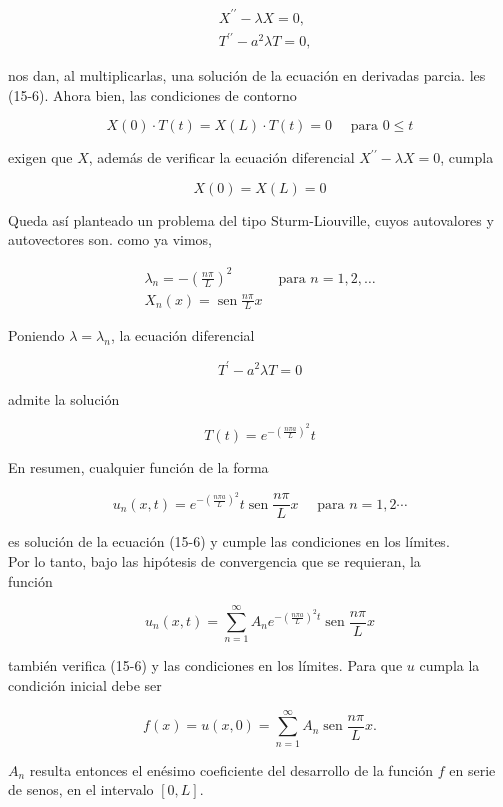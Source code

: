 \documentclass[10pt]{article}
\theoremstyle{plain}
\theoremstyle{definition}
\theoremstyle{remark}
\begin{document}
$$
\begin{aligned}
& X^{\prime \prime}-\lambda X=0, \\
& T^{\prime \prime}-a^{2} \lambda T=0,
\end{aligned}
$$

nos dan, al multiplicarlas, una solución de la ecuación en derivadas parcia. les (15-6). Ahora bien, las condiciones de contorno

$$
X(0) \cdot T(t)=X(L) \cdot T(t)=0 \quad \text { para } 0 \leqslant t
$$

exigen que $X$, además de verificar la ecuación diferencial $X^{\prime \prime}-\lambda X=0$, cumpla

$$
X(0)=X(L)=0
$$

Queda así planteado un problema del tipo Sturm-Liouville, cuyos autovalores y autovectores son. como ya vimos,

$$
\begin{array}{ll}
\lambda_{n}=-\left(\frac{n \pi}{L}\right)^{2} & \text { para } n=1,2, \ldots \\
X_{n}(x)=\operatorname{sen} \frac{n \pi}{L} x &
\end{array}
$$

Poniendo $\lambda=\lambda_{n}$, la ecuación diferencial

$$
T^{\prime}-a^{2} \lambda T=0
$$

admite la solución

$$
T(t)=e^{-\left(\frac{n \pi a}{L}\right)^{2}} t
$$

En resumen, cualquier función de la forma

$$
u_{n}(x, t)=e^{-\left(\frac{n \pi a}{L}\right)^{2}} t \operatorname{sen} \frac{n \pi}{L} x \quad \text { para } n=1,2 \cdots
$$

es solución de la ecuación (15-6) y cumple las condiciones en los límites.\\
Por lo tanto, bajo las hipótesis de convergencia que se requieran, la\\
función

$$
u_{n}(x, t)=\sum_{n=1}^{\infty} A_{n} e^{-\left(\frac{n \pi a}{L}\right)^{2} t} \operatorname{sen} \frac{n \pi}{L} x
$$

también verifica (15-6) y las condiciones en los límites. Para que $u$ cumpla la condición inicial debe ser

$$
f(x)=u(x, 0)=\sum_{n=1}^{\infty} A_{n} \operatorname{sen} \frac{n \pi}{L} x .
$$

$A_{n}$ resulta entonces el enésimo coeficiente del desarrollo de la función $f$ en serie de senos, en el intervalo $[0, L]$.
\end{document}
